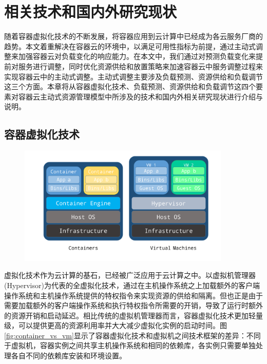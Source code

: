 
\chapter{相关技术和国内外研究现状}
\label{chap:art_of_state}
随着容器虚拟化技术的不断发展，将容器应用到云计算中已经成为各云服务厂商的趋势。本文着重解决在容器云的环境中，以满足可用性指标为前提，通过主动式调整来加强容器云对负载变化的响应能力。在本文中，我们通过对预测负载变化来提前对服务进行调整，同时优化资源供给和放置策略来加速容器云中服务调整过程来实现容器云中的主动式调整。主动式调整主要涉及负载预测、资源供给和负载调节这三个方面。本章将从容器虚拟化技术、负载预测、资源供给和负载调节这四个要素对容器云主动式资源管理模型中所涉及的技术和国内外相关研究现状进行介绍与说明。

\section{容器虚拟化技术} 
\begin{figure}[H]
\centering
\includegraphics[width=0.9\textwidth]{./figure/container-vm}
\end{figure}
虚拟化技术作为云计算的基石，已经被广泛应用于云计算之中\cite{zhang2010cloud}。以虚拟机管理器(Hypervisor)为代表的全虚拟化技术，通过在主机操作系统之上加载额外的客户端操作系统和主机操作系统提供的特权指令来实现资源的供给和隔离。但也正是由于需要加载额外的客户端操作系统和执行特权指令所需要的开销，导致了运行时额外的资源开销和启动延迟\cite{bernstein2014containers}。相比传统的虚拟机管理器而言，容器虚拟化技术更加轻量级，可以提供更高的资源利用率并大大减少虚拟化实例的启动时间\cite{soltesz2007container}。图\ref{fig:container_vs_vm}显示了容器虚拟化技术和虚拟机之间技术框架的差异：不同于虚拟机，容器实例之间共享主机操作系统和相同的依赖库，各实例只需要单独处理各自不同的依赖库安装和环境设置。

